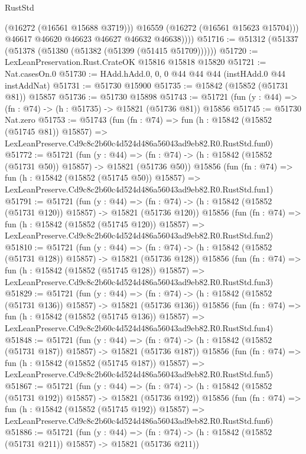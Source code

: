 \begin{lexlean}{RustStd}
\begin{coremodule}
                (@16272 (@16561 @15688 @3719)))
              @16559
              (@16272 (@16561 @15623 @15704)))
            @46617
            @46620
            @46623
            @46627
            @46632
            @46638))))
@51716 := @51312 (@51337 (@51378 (@51380 (@51382 (@51399 (@51415 @51709))))))
@51720 := LexLeanPreservation.Rust.CrateOK @15816 @15818 @15820
@51721 := Nat.casesOn.{0}
@51730 := HAdd.hAdd.{0, 0, 0} @44 @44 @44 (instHAdd.{0} @44 instAddNat)
@51731 := @51730 @15900
@51735 := @15842 (@15852 (@51731 @81)) @15857
@51736 := @51730 @15898
@51743 := @51721 (fun (y : @44) => (fn : @74) -> (h : @51735) -> @15821 (@51736 @81)) @15856
@51745 := @51730 Nat.zero
@51753 := @51743
    (fun (fn : @74) =>
    fun (h : @15842 (@15852 (@51745 @81)) @15857) =>
    LexLeanPreserve.Cd9c8c2b60c4d524d486a56043ad9eb82.R0.RustStd.fun0)
@51772 := @51721
    (fun (y : @44) =>
    (fn : @74) -> (h : @15842 (@15852 (@51731 @50)) @15857) -> @15821 (@51736 @50))
    @15856
    (fun (fn : @74) =>
    fun (h : @15842 (@15852 (@51745 @50)) @15857) =>
    LexLeanPreserve.Cd9c8c2b60c4d524d486a56043ad9eb82.R0.RustStd.fun1)
@51791 := @51721
    (fun (y : @44) =>
    (fn : @74) -> (h : @15842 (@15852 (@51731 @120)) @15857) -> @15821 (@51736 @120))
    @15856
    (fun (fn : @74) =>
    fun (h : @15842 (@15852 (@51745 @120)) @15857) =>
    LexLeanPreserve.Cd9c8c2b60c4d524d486a56043ad9eb82.R0.RustStd.fun2)
@51810 := @51721
    (fun (y : @44) =>
    (fn : @74) -> (h : @15842 (@15852 (@51731 @128)) @15857) -> @15821 (@51736 @128))
    @15856
    (fun (fn : @74) =>
    fun (h : @15842 (@15852 (@51745 @128)) @15857) =>
    LexLeanPreserve.Cd9c8c2b60c4d524d486a56043ad9eb82.R0.RustStd.fun3)
@51829 := @51721
    (fun (y : @44) =>
    (fn : @74) -> (h : @15842 (@15852 (@51731 @136)) @15857) -> @15821 (@51736 @136))
    @15856
    (fun (fn : @74) =>
    fun (h : @15842 (@15852 (@51745 @136)) @15857) =>
    LexLeanPreserve.Cd9c8c2b60c4d524d486a56043ad9eb82.R0.RustStd.fun4)
@51848 := @51721
    (fun (y : @44) =>
    (fn : @74) -> (h : @15842 (@15852 (@51731 @187)) @15857) -> @15821 (@51736 @187))
    @15856
    (fun (fn : @74) =>
    fun (h : @15842 (@15852 (@51745 @187)) @15857) =>
    LexLeanPreserve.Cd9c8c2b60c4d524d486a56043ad9eb82.R0.RustStd.fun5)
@51867 := @51721
    (fun (y : @44) =>
    (fn : @74) -> (h : @15842 (@15852 (@51731 @192)) @15857) -> @15821 (@51736 @192))
    @15856
    (fun (fn : @74) =>
    fun (h : @15842 (@15852 (@51745 @192)) @15857) =>
    LexLeanPreserve.Cd9c8c2b60c4d524d486a56043ad9eb82.R0.RustStd.fun6)
@51886 := @51721
    (fun (y : @44) =>
    (fn : @74) -> (h : @15842 (@15852 (@51731 @211)) @15857) -> @15821 (@51736 @211))

\end{coremodule}
\end{lexlean}
